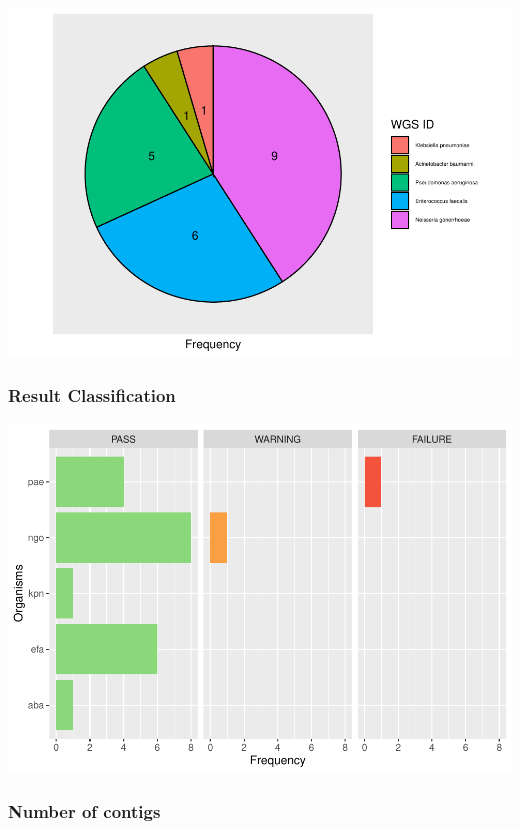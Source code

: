 \documentclass[
  a4paper,
]{article}
\begin{document}
\fontsize{7}{8}
\selectfont
\captionsetup[table]{labelformat=empty}
\renewcommand{\arraystretch}{1.2}

\includegraphics{qualifyr_report_2024-07-08_files/figure-latex/pie_chart-1.pdf}

\subsubsection{Result Classification}\label{result-classification}

\includegraphics{qualifyr_report_2024-07-08_files/figure-latex/organism results-1.pdf}

\subsubsection{Number of contigs}\label{number-of-contigs}
\end{document}
